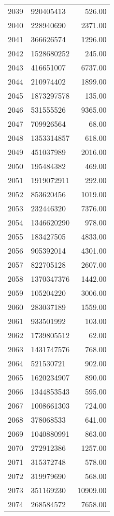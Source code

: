 \begin{table}[ht]
\begin{tabular}{rlr}
  2039 & 920405413 & 526.00 \\ 
  2040 & 228940690 & 2371.00 \\ 
  2041 & 366626574 & 1296.00 \\ 
  2042 & 1528680252 & 245.00 \\ 
  2043 & 416651007 & 6737.00 \\ 
  2044 & 210974402 & 1899.00 \\ 
  2045 & 1873297578 & 135.00 \\ 
  2046 & 531555526 & 9365.00 \\ 
  2047 & 709926564 & 68.00 \\ 
  2048 & 1353314857 & 618.00 \\ 
  2049 & 451037989 & 2016.00 \\ 
  2050 & 195484382 & 469.00 \\ 
  2051 & 1919072911 & 292.00 \\ 
  2052 & 853620456 & 1019.00 \\ 
  2053 & 232446320 & 7376.00 \\ 
  2054 & 1346620290 & 978.00 \\ 
  2055 & 183427505 & 4833.00 \\ 
  2056 & 905392014 & 4301.00 \\ 
  2057 & 822705128 & 2607.00 \\ 
  2058 & 1370347376 & 1442.00 \\ 
  2059 & 105204220 & 3006.00 \\ 
  2060 & 283037189 & 1559.00 \\ 
  2061 & 933501992 & 103.00 \\ 
  2062 & 1739805512 & 62.00 \\ 
  2063 & 1431747576 & 768.00 \\ 
  2064 & 521530721 & 902.00 \\ 
  2065 & 1620234907 & 890.00 \\ 
  2066 & 1344853543 & 595.00 \\ 
  2067 & 1008661303 & 724.00 \\ 
  2068 & 378068533 & 641.00 \\ 
  2069 & 1040880991 & 863.00 \\ 
  2070 & 272912386 & 1257.00 \\ 
  2071 & 315372748 & 578.00 \\ 
  2072 & 319979690 & 568.00 \\ 
  2073 & 351169230 & 10909.00 \\ 
  2074 & 268584572 & 7658.00 \\ 

\end{tabular}
\end{table}
